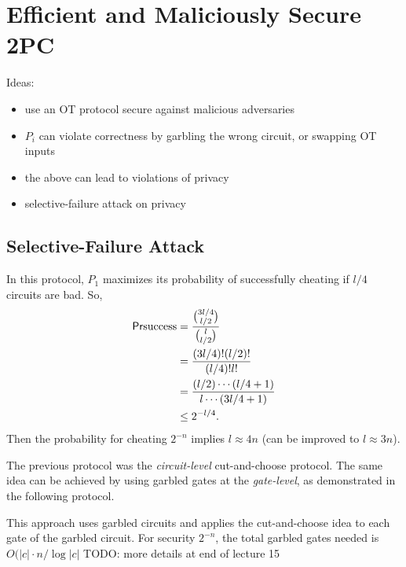 \section{Efficient and Maliciously Secure 2PC}

Ideas:
\begin{itemize}
\item use an OT protocol secure against malicious adversaries
\item $P_i$ can violate correctness by garbling the wrong circuit, or swapping OT inputs
\item the above can lead to violations of privacy
\item selective-failure attack on privacy
\end{itemize}

\subsection{Selective-Failure Attack}


\begin{prcl}
In this protocol, $P_1$ maximizes its probability of successfully cheating if $l/4$ circuits are bad.
So,
\begin{align*}
    \mathsf{Pr}{\text{success}} 
    &=
    \frac{\binom{3 l / 4}{l / 2}}{\binom{l}{l / 2}}
    \\ &=
    \frac{(3l/4)! (l/2)!}{(l/4)! l!}
    \\ &=
    \frac{(l/2) \cdots (l/4 + 1)}{l \cdots (3l/4 + 1)}
    \\ &\leq 
    2^{-l/4}.
\end{align*}
Then the probability for cheating $2^{-n}$ implies $l \approx 4n$
(can be improved to $l \approx 3n$).
\end{prcl}

The previous protocol was the \textit{circuit-level} cut-and-choose protocol. The same idea can be achieved by using garbled gates at the \textit{gate-level}, as demonstrated in the following protocol.

\begin{prcl}
This approach uses garbled circuits and applies the cut-and-choose idea to each gate of the garbled circuit.
For security $2^{-n}$, the total garbled gates needed is $O(|c| \cdot n / \log|c|$
TODO: more details at end of lecture 15
\end{prcl}